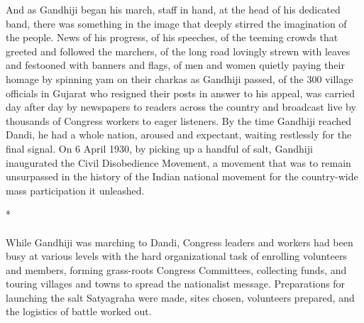 \begin{multicols}{2}
And as Gandhiji began his march, staff in hand, at the head of his dedicated band, there was something in the image that deeply stirred the imagination of the people. News of his progress, of his speeches, of the teeming crowds that greeted and followed the marchers, of the long road lovingly strewn with leaves and festooned with banners and flags, of men and women quietly paying their homage by spinning yam on their charkas as Gandhiji passed, of the 300 village officials in Gujarat who resigned their posts in answer to his appeal, was carried day after day by newspapers to readers across the country and broadcast live by thousands of Congress workers to eager listeners. By the time Gandhiji reached Dandi, he had a whole nation, aroused and expectant, waiting restlessly for the final signal. On 6 April 1930, by picking up a handful of salt, Gandhiji inaugurated the Civil Disobedience Movement, a movement that was to remain unsurpassed in the history of the Indian national movement for the country-wide mass participation it unleashed.

\begin{center}*\end{center}

\paragraph*{}

While Gandhiji was marching to Dandi, Congress leaders and workers had been busy at various levels with the hard organizational task of enrolling volunteers and members, forming grass-roots Congress Committees, collecting funds, and touring villages and towns to spread the nationalist message. Preparations for launching the salt Satyagraha were made, sites chosen, volunteers prepared, and the logistics of battle worked out.


\end{multicols}
